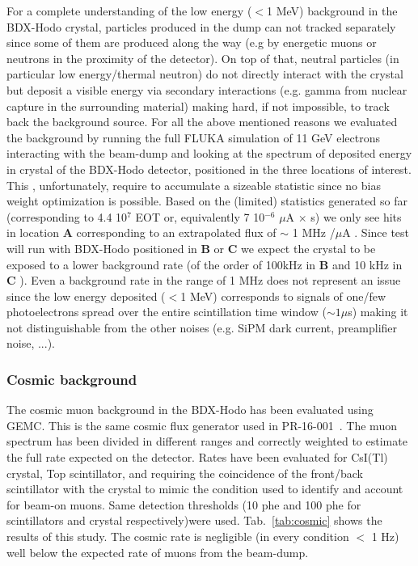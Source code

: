 For a complete understanding of the low energy ($<$1 MeV) background in the BDX-Hodo crystal, particles produced in the dump can not tracked separately since some of them are produced along the way (e.g by energetic muons or neutrons in the proximity of the detector).
On top of that, neutral particles (in particular low energy/thermal neutron) do not directly interact with the crystal but deposit a visible energy via secondary interactions (e.g. gamma from nuclear capture in the surrounding material) making hard, if not impossible,  to track back the background source. For all the above mentioned reasons we evaluated the background by running the full FLUKA simulation of 11 GeV electrons interacting with the beam-dump and looking at the spectrum of deposited energy in crystal of the BDX-Hodo detector,  positioned  in the three locations of interest. This , unfortunately, require to accumulate a sizeable statistic since no bias weight optimization is possible. Based on the (limited) statistics generated so far (corresponding to 4.4 10$^7$ EOT or, equivalently 7 10$^{-6}$ $\mu$A $\times$  s) we only see hits in location {\bf A} corresponding to an extrapolated flux of $\sim$ 1 MHz /$\mu$A .
Since test will run with BDX-Hodo positioned in   {\bf B} or {\bf C} we expect the crystal to be exposed to  a lower background rate (of the order of 100kHz in   {\bf B}  and 10 kHz in {\bf C} ). Even a background rate in the range of 1 MHz does not represent an issue since the low energy deposited ($<$1 MeV) corresponds to signals of one/few photoelectrons spread over the entire scintillation time window ($\sim 1 \mu$s) making it not distinguishable from the other noises (e.g. SiPM dark current, preamplifier noise, ...).








\subsubsection{Cosmic background}
The cosmic muon background in the BDX-Hodo has been evaluated using GEMC. This is the same cosmic flux generator used in PR-16-001~\cite{bdx-proposal}. The muon spectrum has been divided in different ranges  and correctly weighted to estimate the full rate expected on the detector. Rates have been evaluated for CsI(Tl) crystal, Top scintillator,  and requiring  the coincidence of the front/back scintillator with the crystal  to mimic the condition used to identify and account for beam-on muons. Same detection thresholds (10 phe and 100 phe for scintillators and crystal respectively)were used. Tab.~\ref{tab:cosmic} shows the results of this study. The cosmic rate is negligible (in every condition $<$ 1 Hz) well below the expected rate of muons from the beam-dump.

